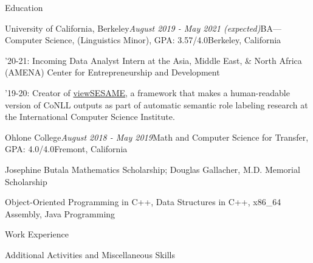 \documentclass{resume} %
\begin{document}

\begin{rSection}{Education}
\begin{rSubsection}{University of California, Berkeley}{\em August 2019 - May 2021 (expected)}{BA---Computer Science, (Linguistics Minor), GPA: 3.57/4.0}{Berkeley, California}
\item '20-21: Incoming Data Analyst Intern at the Asia, Middle East, \& North Africa (AMENA) Center for Entrepreneurship and Development
\item '19-20: Creator of \href{https://github.com/citronella3alain/view-sesame}{viewSESAME}, a framework that makes a human-readable version of CoNLL outputs as part of automatic semantic role labeling research at the International Computer Science Institute.
\end{rSubsection}
\begin{rSubsection}{Ohlone College}{\em August 2018 - May 2019}{Math and Computer Science for Transfer, GPA: 4.0/4.0}{Fremont, California}
\item Josephine Butala Mathematics Scholarship; Douglas Gallacher, M.D. Memorial Scholarship
\item Object-Oriented Programming in C++, Data Structures in C++, x86\_64 Assembly, Java Programming
\end{rSubsection}
\end{rSection}
\begin{rSection}{Work Experience}



%
\end{rSection}
\begin{rSection}{Additional Activities and Miscellaneous Skills}

\end{rSection}
\end{document}
